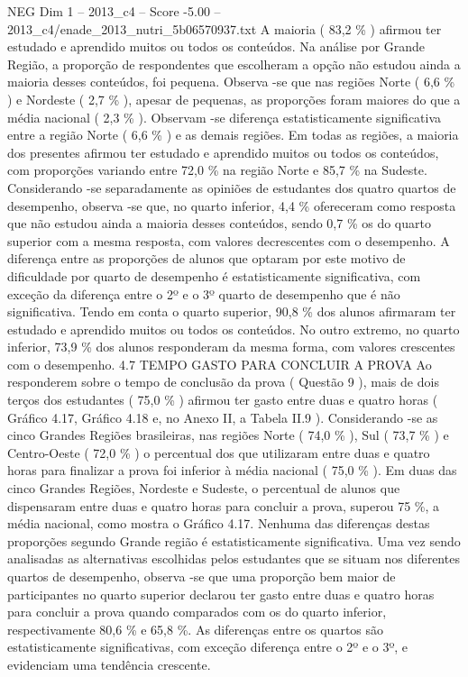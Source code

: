 \begin{textsample}{NEG Dim 1 – 2013\_c4 – Score -5.00 – 2013\_c4/enade\_2013\_nutri\_5b06570937.txt}
A maioria ( 83,2 \% ) afirmou ter estudado e aprendido muitos ou todos os conteúdos.
Na análise por Grande Região, a proporção de respondentes que escolheram a opção não estudou ainda a maioria desses conteúdos, foi pequena.
Observa -se que nas regiões Norte ( 6,6 \% ) e Nordeste ( 2,7 \% ), apesar de pequenas, as proporções foram maiores do que a média nacional ( 2,3 \% ).
Observam -se diferença estatisticamente significativa entre a região Norte ( 6,6 \% ) e as demais regiões.
Em todas as regiões, a maioria dos presentes afirmou ter estudado e aprendido muitos ou todos os conteúdos, com proporções variando entre 72,0 \% na região Norte e 85,7 \% na Sudeste.
Considerando -se separadamente as opiniões de estudantes dos quatro quartos de desempenho, observa -se que, no quarto inferior, 4,4 \% ofereceram como resposta que não estudou ainda a maioria desses conteúdos, sendo 0,7 \% os do quarto superior com a mesma resposta, com valores decrescentes com o desempenho.
A diferença entre as proporções de alunos que optaram por este motivo de dificuldade por quarto de desempenho é estatisticamente significativa, com exceção da diferença entre o 2º e o 3º quarto de desempenho que é não significativa.
Tendo em conta o quarto superior, 90,8 \% dos alunos afirmaram ter estudado e aprendido muitos ou todos os conteúdos.
No outro extremo, no quarto inferior, 73,9 \% dos alunos responderam da mesma forma, com valores crescentes com o desempenho. 4.7 TEMPO GASTO PARA CONCLUIR A PROVA Ao responderem sobre o tempo de conclusão da prova ( Questão 9 ), mais de dois terços dos estudantes ( 75,0 \% ) afirmou ter gasto entre duas e quatro horas ( Gráfico 4.17, Gráfico 4.18 e, no Anexo II, a Tabela II.9 ).
Considerando -se as cinco Grandes Regiões brasileiras, nas regiões Norte ( 74,0 \% ), Sul ( 73,7 \% ) e Centro-Oeste ( 72,0 \% ) o percentual dos que utilizaram entre duas e quatro horas para finalizar a prova foi inferior à média nacional ( 75,0 \% ).
Em duas das cinco Grandes Regiões, Nordeste e Sudeste, o percentual de alunos que dispensaram entre duas e quatro horas para concluir a prova, superou 75 \%, a média nacional, como mostra o Gráfico 4.17.
Nenhuma das diferenças destas proporções segundo Grande região é estatisticamente significativa.
Uma vez sendo analisadas as alternativas escolhidas pelos estudantes que se situam nos diferentes quartos de desempenho, observa -se que uma proporção bem maior de participantes no quarto superior declarou ter gasto entre duas e quatro horas para concluir a prova quando comparados com os do quarto inferior, respectivamente 80,6 \% e 65,8 \%.
As diferenças entre os quartos são estatisticamente significativas, com exceção diferença entre o 2º e o 3º, e evidenciam uma tendência crescente.

\end{textsample}
